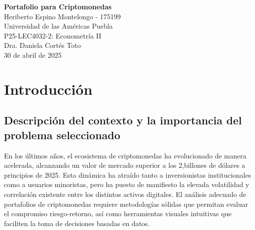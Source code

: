 \documentclass[12pt,letterpaper]{article}   %
\begin{document}
\begin{titlepage}
    \begin{center}
        \vspace*{2cm}
        \textbf{Portafolio para Criptomonedas}\\[2cm]

        Heriberto Espino Montelongo - 175199\\[0.5cm]
        Universidad de las Américas Puebla\\[0.5cm]
        P25-LEC4032-2: Econometría II\\[0.5cm]
        Dra. Daniela Cortés Toto\\[0.5cm]
        30 de abril de 2025\\
    \end{center}
    \vfill
\end{titlepage}




\setcounter{page}{1}
\tableofcontents
\newpage



\setcounter{page}{1}













\section{Introducción}
\subsection{Descripción del contexto y la importancia del problema seleccionado}
En los últimos años, el ecosistema de criptomonedas ha evolucionado de manera acelerada, alcanzando un valor de mercado superior a los 2,billones de dólares a principios de 2025. Esta dinámica ha atraído tanto a inversionistas institucionales como a usuarios minoristas, pero ha puesto de manifiesto la elevada volatilidad y correlación existente entre los distintos activos digitales. El análisis adecuado de portafolios de criptomonedas requiere metodologías sólidas que permitan evaluar el compromiso riesgo-retorno, así como herramientas visuales intuitivas que faciliten la toma de decisiones basadas en datos.\newline
\end{document}
